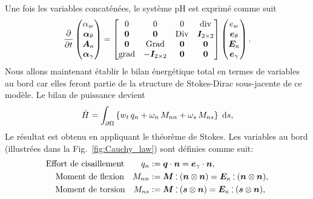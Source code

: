 Une fois les variables concaténées, le système pH est exprimé comme suit
\begin{equation*}
\diffp{}{t}
\begin{pmatrix}
\alpha_w \\
\bm\alpha_\theta \\
\bm{A}_\kappa \\
\bm\alpha_{\gamma} \\
\end{pmatrix} = 
\begin{bmatrix}
0  & 0  & 0  & \div \\
\bm{0} & \bm{0} &  \Div & \bm{I}_{2 \times 2}\\
\bm{0}  & \Grad  & \bm{0}  & \bm{0}\\
\grad & -\bm{I}_{2 \times 2} &  \bm{0} & \bm{0} \\
\end{bmatrix}
\begin{pmatrix}
e_w \\
\bm{e}_{\theta} \\
\bm{E}_{\kappa} \\
\bm{e}_{\gamma} \\
\end{pmatrix}.
\end{equation*}
Nous allons maintenant établir le bilan énergétique total en termes de variables au bord car elles feront partie de la structure de Stokes-Dirac sous-jacente de ce modèle. Le bilan de puissance devient
\begin{equation*}
\dot{H}= \int_{\partial \Omega} \left\{ w_t \, q_n  + \omega_n \, M_{nn} + \omega_s \, M_{ns} \right\} \d{s},  
\end{equation*}
Le résultat est obtenu en appliquant le théorème de Stokes. Les variables au bord (illustrées dans la Fig.~\ref{fig:Cauchy_law}) sont définies comme suit:
\begin{equation*}
\begin{aligned}
\text{Effort de cisaillement}  \qquad q_{n} &:= \bm{q} \cdot \bm{n}=  \bm{e}_{\gamma} \cdot \bm{n},  \\
\text{Moment de flexion} \quad 
M_{nn} &:=  \bm{M} \cddot (\bm{n}\otimes{\bm{n}}) = \bm{E}_{\kappa} \cddot (\bm{n}\otimes{\bm{n}}), 	\\
\text{Moment de torsion} \quad M_{ns} &:= \bm{M} \cddot (\bm{s}\otimes{\bm{n}}) = \bm{E}_{\kappa} \cddot (\bm{s}\otimes{\bm{n}}),	
\end{aligned}
\end{equation*}

